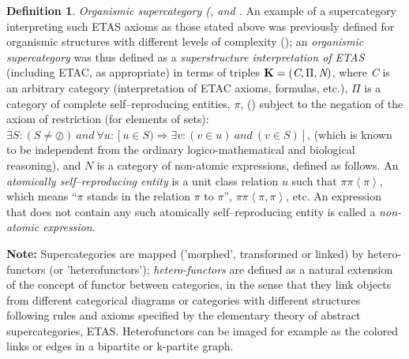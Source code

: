 \documentclass[12pt]{article}
\theoremstyle{plain}
\theoremstyle{definition}
\newtheorem{definition}{Definition}[section]
\numberwithin{equation}{section}
\begin{document}
\begin{definition} 

 \emph{Organismic supercategory (\cite{ICBM},\cite{ICB3} and \cite{ICB1}.}
An example of a supercategory interpreting such ETAS axioms as those stated above
was previously defined for organismic structures with different levels of complexity (\cite{ICB3}); an \textit{organismic supercategory} was thus defined as a \textit{superstructure interpretation of ETAS} (including ETAC, as appropriate) in terms of triples $\textbf{K} = (\emph{C}, \Pi, \textit{N})$, where \emph{C} is an arbitrary category (interpretation of ETAC axioms, formulas, etc.), $\Pi$ is a category of complete self--reproducing entities, $\pi$, (\cite{LO68}) subject to the negation of the axiom of restriction (for elements of sets):
$ \exists S: (S \neq \oslash) ~ and ~ \forall u: [u \in S) \Rightarrow \exists v: (v \in u)~ and ~( v \in S)]$, (which is known to be independent from the ordinary logico-mathematical and biological reasoning), 
and $\textit{N}$ is a category of non-atomic expressions, defined as follows.  An  \textit{atomically self--reproducing entity} is a unit class relation $u$ such that  $\pi \pi \left\langle \pi \right\rangle$, which means 
``$\pi$ stands in the relation $\pi$ to $\pi$'', $\pi \pi \left\langle \pi , \pi \right\rangle$, etc. 
An expression that does not contain any such atomically self--reproducing entity is called a \textit{non-atomic expression}. 
\end{definition}

\textbf{Note:}
Supercategories are mapped ('morphed', transformed or linked) by hetero-functors (or 'heterofunctors'); {\em hetero-functors} are defined as a natural extension of the concept of functor between categories, in the sense that they link objects from different categorical diagrams or categories with different structures following rules and axioms specified by the elementary theory of abstract supercategories, ETAS. Heterofunctors can be imaged for example as the colored links or edges in a bipartite or k-partite graph.
\end{document}
